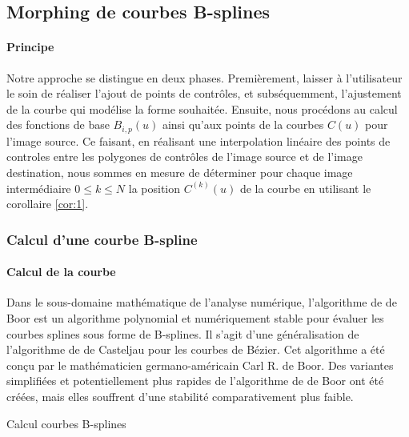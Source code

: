 \newpage
\subsection{Morphing de courbes B-splines}
\paragraph{Principe} Notre approche se distingue en deux phases. Premièrement, laisser à l'utilisateur le soin de réaliser
l'ajout de points de contrôles, et subséquemment, l'ajustement de la courbe qui modélise la forme souhaitée. Ensuite, nous procédons
au calcul des fonctions de base $B_{i,p}(u)$ ainsi qu'aux points de la courbes $C(u)$ pour l'image source. Ce faisant, en réalisant
une interpolation linéaire des points de controles entre les polygones de contrôles de l'image source et de l'image destination,
nous sommes en mesure de déterminer pour chaque image intermédiaire $0\leq k\leq N$ la position $C^{(k)}(u)$ de la courbe en utilisant
le corollaire \ref{cor:1}.
\subsubsection{Calcul d'une courbe B-spline}
\paragraph{Calcul de la courbe} Dans le sous-domaine mathématique de l'analyse numérique, l'algorithme de de Boor \cite{sheneGeometryNotes} est un algorithme polynomial 
et numériquement stable pour évaluer les courbes splines sous forme de B-splines. 
Il s'agit d'une généralisation de l'algorithme de de Casteljau pour les courbes de Bézier. 
Cet algorithme a été conçu par le mathématicien germano-américain Carl R. de Boor. 
Des variantes simplifiées et potentiellement plus rapides de l'algorithme de de Boor ont été créées, mais elles souffrent d'une stabilité comparativement plus faible.
\begin{algorithm}[h!]
    \BlankLine
    \caption{Calcul courbes B-splines}
    \label{algo:deboor}
\end{algorithm}
